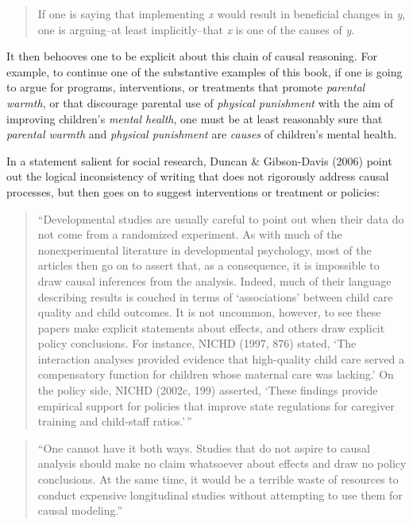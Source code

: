 \documentclass[
  letterpaper,
  DIV=11,
  numbers=noendperiod]{scrreprt}
\begin{document}
\begin{quote}
If one is saying that implementing \emph{x} would result in beneficial
changes in \emph{y}, one is arguing--at least implicitly--that \emph{x}
is one of the causes of \emph{y}.
\end{quote}

It then behooves one to be explicit about this chain of causal
reasoning. For example, to continue one of the substantive examples of
this book, if one is going to argue for programs, interventions, or
treatments that promote \emph{parental warmth}, or that discourage
parental use of \emph{physical punishment} with the aim of improving
children's \emph{mental health}, one must be at least reasonably sure
that \emph{parental warmth} and \emph{physical punishment} are
\emph{causes} of children's mental health.

In a statement salient for social research, Duncan \& Gibson-Davis
(2006) point out the logical inconsistency of writing that does not
rigorously address causal processes, but then goes on to suggest
interventions or treatment or policies:

\begin{quote}
``Developmental studies are usually careful to point out when their data
do not come from a randomized experiment. As with much of the
nonexperimental literature in developmental psychology, most of the
articles then go on to assert that, as a consequence, it is impossible
to draw causal inferences from the analysis. Indeed, much of their
language describing results is couched in terms of `associations'
between child care quality and child outcomes. It is not uncommon,
however, to see these papers make explicit statements about effects, and
others draw explicit policy conclusions. For instance, NICHD (1997, 876)
stated, `The interaction analyses provided evidence that high-quality
child care served a compensatory function for children whose maternal
care was lacking.' On the policy side, NICHD (2002c, 199) asserted,
`These findings provide empirical support for policies that improve
state regulations for caregiver training and child-staff ratios.'\,''
\end{quote}

\begin{quote}
``One cannot have it both ways. Studies that do not aspire to causal
analysis should make no claim whatsoever about effects and draw no
policy conclusions. At the same time, it would be a terrible waste of
resources to conduct expensive longitudinal studies without attempting
to use them for causal modeling.''
\end{quote}
\end{document}
